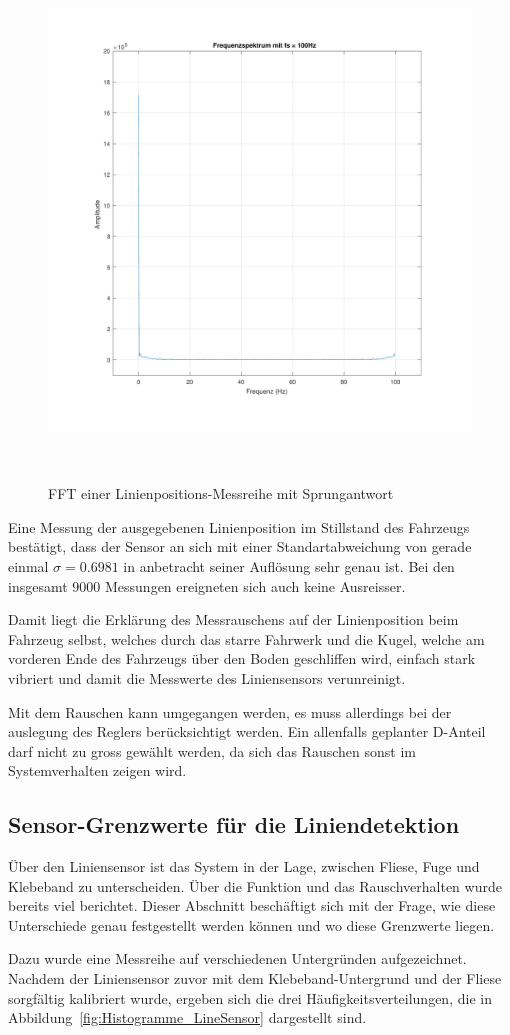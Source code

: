 \documentclass[main.tex]{subfiles} %
\begin{document}
\begin{figure}[H]
    \centering
    \includegraphics[width=0.5\linewidth]{fig_Parametrierung_Linienfolgeregler/FFT_START.pdf}
    \caption{FFT einer Linienpositions-Messreihe mit Sprungantwort}~\label{fig:FFT_START}
\end{figure}

Eine Messung der ausgegebenen Linienposition im Stillstand des Fahrzeugs
bestätigt, dass der Sensor an sich mit einer Standartabweichung von gerade
einmal $\sigma = 0.6981$ in anbetracht seiner Auflösung sehr genau ist. Bei den
insgesamt $9000$ Messungen ereigneten sich auch keine Ausreisser.

Damit liegt die Erklärung des Messrauschens auf der Linienposition beim
Fahrzeug selbst, welches durch das starre Fahrwerk und die Kugel, welche am
vorderen Ende des Fahrzeugs über den Boden geschliffen wird, einfach stark
vibriert und damit die Messwerte des Liniensensors verunreinigt.

Mit dem Rauschen kann umgegangen werden, es muss allerdings bei der auslegung
des Reglers berücksichtigt werden. Ein allenfalls geplanter D-Anteil darf nicht
zu gross gewählt werden, da sich das Rauschen sonst im Systemverhalten zeigen
wird.

\subsection*{Sensor-Grenzwerte für die Liniendetektion}\label{apdx:Liniensensor_Liniendetektion}

Über den Liniensensor ist das System in der Lage, zwischen Fliese, Fuge und Klebeband
zu unterscheiden. Über die Funktion und das Rauschverhalten wurde bereits viel
berichtet. Dieser Abschnitt beschäftigt sich mit der Frage, wie diese Unterschiede genau
festgestellt werden können und wo diese Grenzwerte liegen.

Dazu wurde eine Messreihe auf verschiedenen Untergründen aufgezeichnet. Nachdem
der Liniensensor zuvor mit dem Klebeband-Untergrund und der Fliese sorgfältig
kalibriert wurde, ergeben sich die drei Häufigkeitsverteilungen, die in
Abbildung~\ref{fig:Histogramme_LineSensor} dargestellt sind.
\end{document}
